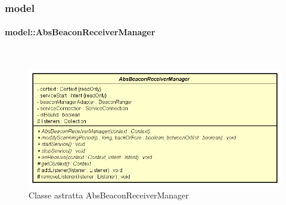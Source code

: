 \documentclass[../DefinizioneDiProdotto.tex]{subfiles}
\begin{document}
\subsubsection{model}

\paragraph{model::AbsBeaconReceiverManager}
\
\begin{figure}[H]
	\centering
	\includegraphics[width=\maxwidth]{img/AbsBeaconReceiverManager.png}
	\caption{Classe astratta AbsBeaconReceiverManager}\label{fig:model::AbsBeaconReceiverManager} 
\end{figure}
\end{document}
